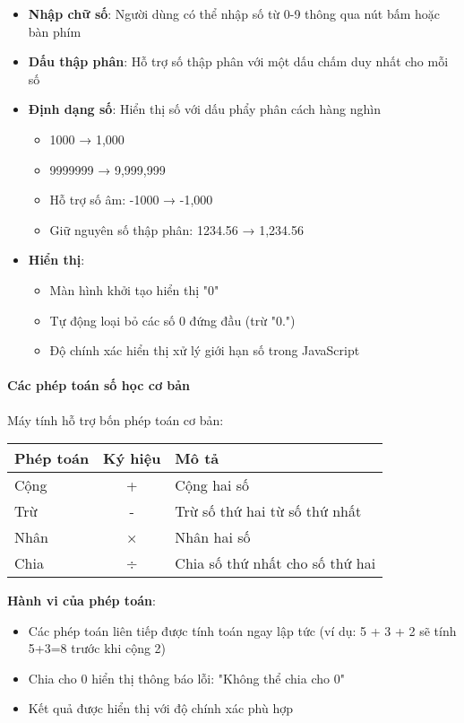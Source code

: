 \begin{itemize}
    \item \textbf{Nhập chữ số}: Người dùng có thể nhập số từ 0-9 thông qua nút bấm hoặc bàn phím
    \item \textbf{Dấu thập phân}: Hỗ trợ số thập phân với một dấu chấm duy nhất cho mỗi số
    \item \textbf{Định dạng số}: Hiển thị số với dấu phẩy phân cách hàng nghìn
    \begin{itemize}
        \item 1000 → 1,000
        \item 9999999 → 9,999,999
        \item Hỗ trợ số âm: -1000 → -1,000
        \item Giữ nguyên số thập phân: 1234.56 → 1,234.56
    \end{itemize}
    \item \textbf{Hiển thị}:
    \begin{itemize}
        \item Màn hình khởi tạo hiển thị "0"
        \item Tự động loại bỏ các số 0 đứng đầu (trừ "0.")
        \item Độ chính xác hiển thị xử lý giới hạn số trong JavaScript
    \end{itemize}
\end{itemize}

\paragraph{Các phép toán số học cơ bản}

Máy tính hỗ trợ bốn phép toán cơ bản:

\begin{center}
\begin{tabular}{|l|c|p{8cm}|}
\hline
\textbf{Phép toán} & \textbf{Ký hiệu} & \textbf{Mô tả} \\
\hline
Cộng & + & Cộng hai số \\
\hline
Trừ & - & Trừ số thứ hai từ số thứ nhất \\
\hline
Nhân & × & Nhân hai số \\
\hline
Chia & ÷ & Chia số thứ nhất cho số thứ hai \\
\hline
\end{tabular}
\end{center}

\textbf{Hành vi của phép toán}:
\begin{itemize}
    \item Các phép toán liên tiếp được tính toán ngay lập tức (ví dụ: 5 + 3 + 2 sẽ tính 5+3=8 trước khi cộng 2)
    \item Chia cho 0 hiển thị thông báo lỗi: "Không thể chia cho 0"
    \item Kết quả được hiển thị với độ chính xác phù hợp
\end{itemize}

